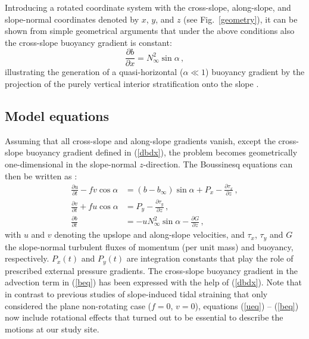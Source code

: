 Introducing a rotated coordinate system with the cross-slope,
along-slope, and slope-normal coordinates denoted by $x$, $y$, and $z$
(see Fig.\ \ref{geometry}), it can be shown from simple geometrical
arguments that under the above conditions also the cross-slope
buoyancy gradient is constant:
\begin{equation}
  \label{dbdx}
  \frac{\partial b}{\partial x} = N^2_\infty \sin \alpha \, ,
\end{equation}
illustrating the generation of a quasi-horizontal ($\alpha \ll 1$)
buoyancy gradient by the projection of the purely vertical interior
stratification onto the slope
\citep{Garrettetal93a,UmlaufBurchard2011a}.

\subsection{Model equations}\label{modelequations}

Assuming that all cross-slope and along-slope gradients vanish, except
the cross-slope buoyancy gradient defined in (\ref{dbdx}), the problem
becomes geometrically one-dimensional in the slope-normal
$z$-direction. The Boussinesq equations can then be written as
\citep{Umlaufetal2015a}:
\begin{align}
  \label{ueq}
  \frac{\partial u}{ \partial t} -fv \cos \alpha  &= (b - b_\infty) \sin \alpha 
+ P_x - \frac{\partial \tau_x}{ \partial z} \, , \\
  \label{veq}
  \frac{ \partial v}{\partial t} + fu \cos \alpha &= P_y - 
\frac{\partial \tau_y}{\partial z}                             \, , \\
  \label{beq}  
  \frac{\partial b}{\partial t} &= -u N^2_\infty \sin \alpha - 
\frac{\partial G}{\partial z}                              \, , 
\end{align}
with $u$ and $v$ denoting the upslope and along-slope velocities, and
$\tau_x$, $\tau_y$ and $G$ the slope-normal turbulent fluxes of
momentum (per unit mass) and buoyancy, respectively. $P_x(t)$ and
$P_y(t)$ are integration constants that play the role of prescribed
external pressure gradients. The cross-slope buoyancy gradient in the
advection term in (\ref{beq}) has been expressed with the help of
(\ref{dbdx}). Note that in contrast to previous studies of
slope-induced tidal straining that only considered the plane
non-rotating case ($f=0$, $v=0$), equations (\ref{ueq}) -- (\ref {beq}) now
include rotational effects that turned out to be essential to describe
the motions at our study site.

